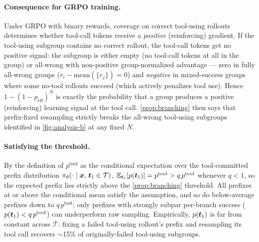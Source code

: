 \paragraph{Consequence for GRPO training.}
Under GRPO with binary rewards, coverage on correct tool-using rollouts determines whether tool-call tokens receive a \emph{positive} (reinforcing) gradient. If the tool-using subgroup contains no correct rollout, the tool-call tokens get no positive signal: the subgroup is either empty (no tool-call tokens at all in the group) or all-wrong with non-positive group-normalized advantage --- zero in fully all-wrong groups ($r_i - \mathrm{mean}(\{r_j\}) = 0$) and \emph{negative} in mixed-success groups where some no-tool rollouts succeed (which actively penalizes tool use). Hence $1 - (1-p_{\text{eff}})^N$ is exactly the probability that a group produces a positive (reinforcing) learning signal at the tool call. \autoref{prop:branching} then says that prefix-fixed resampling strictly breaks the all-wrong tool-using subgroups identified in \autoref{fig:analysis-b} at any fixed $N$.

\paragraph{Satisfying the threshold.}
By the definition of $p^{\text{tool}}$ as the conditional expectation over the tool-committed prefix distribution $\pi_\theta(\cdot \mid {\bm{x}},\, {\bm{t}}_1 \in \mathcal{T})$, $\mathbb{E}_{{\bm{t}}_1}[p({\bm{t}}_1)] = p^{\text{tool}} > q\, p^{\text{tool}}$ whenever $q < 1$, so the expected prefix lies strictly above the \autoref{prop:branching} threshold. All prefixes at or above the conditional mean satisfy the assumption, and so do below-average prefixes down to $q\, p^{\text{tool}}$; only prefixes with strongly subpar per-branch success ($p({\bm{t}}_1) < q\, p^{\text{tool}}$) can underperform raw sampling. Empirically, $p({\bm{t}}_1)$ is far from constant across $\mathcal{T}$: fixing a failed tool-using rollout's prefix and resampling its tool call recovers $\sim$15\% of originally-failed tool-using subgroups.


